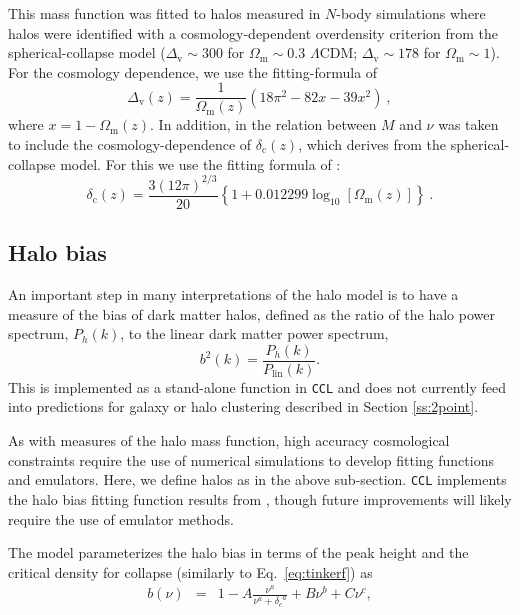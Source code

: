 \documentclass[\docopts]{\docclass}
\newcommand{\ccl}{{\tt CCL}\xspace}
\begin{document}
This mass function was fitted to halos measured in $N$-body simulations where halos were identified with a cosmology-dependent overdensity criterion from the spherical-collapse model ($\Delta_\mathrm{v}\sim 300$ for $\Omega_\mathrm{m}\sim 0.3$ $\Lambda$CDM; $\Delta_\mathrm{v}\sim 178$ for $\Omega_\mathrm{m}\sim 1$). For the cosmology dependence, we use the fitting-formula of \cite{Bryan1998}
\begin{equation}
\Delta_\mathrm{v}(z)=\frac{1}{\Omega_\mathrm{m}(z)}\left(18\pi^2-82x-39x^2\right)\ ,
\label{eq:Deltav_Bryan}
\end{equation}
where $x=1-\Omega_\mathrm{m}(z)$. In addition, in \cite{Sheth1999} the relation between $M$ and $\nu$ was taken to include the cosmology-dependence of $\delta_\mathrm{c}(z)$, which derives from the spherical-collapse model. For this we use the fitting formula of \cite{Nakamura1997}:
\begin{equation}
\delta_\mathrm{c}(z)=\frac{3(12\pi)^{2/3}}{20}\left\{1+0.012299\log_{10}[\Omega_\mathrm{m}(z)]\right\}\ .
\label{eq:deltac_Nakamura}
\end{equation}

\subsection{Halo bias}
\label{sec:hbdef}

An important step in many interpretations of the halo model is to have a measure of the bias of dark matter halos, defined as the ratio of the halo power spectrum, $P_h(k)$, to the linear dark matter power spectrum,
\begin{equation}
  b^2(k) = \frac{P_h(k)}{P_{\mathrm{lin}}(k)}.
  \label{eq:halo_bias}
\end{equation}
This is implemented as a stand-alone function in \ccl and does not currently feed into predictions for galaxy or halo clustering described in Section \ref{ss:2point}.

As with measures of the halo mass function, high accuracy cosmological constraints require the use of numerical simulations to develop fitting functions and emulators. Here, we define halos as in the above sub-section. {\tt CCL} implements the halo bias fitting function results from \citet{Tinker2010}, though future improvements will likely require the use of emulator methods.

The \citet{Tinker2010} model parameterizes the halo bias in terms of the peak height and the critical density for collapse (similarly to Eq.~\ref{eq:tinkerf}) as
\begin{eqnarray}
  b(\nu) &=& 1 - A\frac{\nu^a}{\nu^a + {\delta_c}^a} + B\nu^b+C\nu^c,\\
\end{eqnarray}
\end{document}
